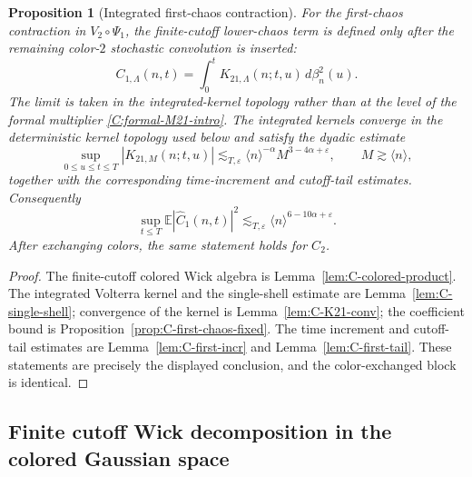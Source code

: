 \documentclass[10pt]{amsart}
\numberwithin{equation}{section}
\theoremstyle{plain}
\newtheorem{proposition}[theorem]{Proposition}
\theoremstyle{definition}
\theoremstyle{remark}
\newcommand{\E}{\mathbb{E}}
\newcommand{\eps}{\varepsilon}
\begin{document}
\begin{proposition}[Integrated first-chaos contraction]\label{prop:C-integrated-first-chaos-contraction}
For the first-chaos contraction in $V_2\circ\Psi_1$, the finite-cutoff lower-chaos term is defined only after the remaining color-$2$ stochastic convolution is inserted:
\[
        C_{1,\Lambda}(n,t)=\int_0^t K_{21,\Lambda}(n;t,u)\,d\beta_n^2(u).
\]
The limit is taken in the integrated-kernel topology rather than at the level of the formal multiplier \eqref{C:formal-M21-intro}.  The integrated kernels converge in the deterministic kernel topology used below and satisfy the dyadic estimate
\[
        \sup_{0\le u\le t\le T}|K_{21,M}(n;t,u)|
        \lesssim_{T,\eps}\langle n\rangle^{-\alpha}M^{3-4\alpha+\eps},
        \qquad M\gtrsim \langle n\rangle,
\]
together with the corresponding time-increment and cutoff-tail estimates.  Consequently
\[
        \sup_{t\le T}\E|\widehat C_1(n,t)|^2
        \lesssim_{T,\eps}\langle n\rangle^{6-10\alpha+\eps}.
\]
After exchanging colors, the same statement holds for $C_2$.
\end{proposition}

\begin{proof}
The finite-cutoff colored Wick algebra is Lemma~\ref{lem:C-colored-product}.  The integrated Volterra kernel and the single-shell estimate are Lemma~\ref{lem:C-single-shell}; convergence of the kernel is Lemma~\ref{lem:C-K21-conv}; the coefficient bound is Proposition~\ref{prop:C-first-chaos-fixed}.  The time increment and cutoff-tail estimates are Lemma~\ref{lem:C-first-incr} and Lemma~\ref{lem:C-first-tail}.  These statements are precisely the displayed conclusion, and the color-exchanged block is identical.
\end{proof}

\subsection{Finite cutoff Wick decomposition in the colored Gaussian space}
\end{document}
